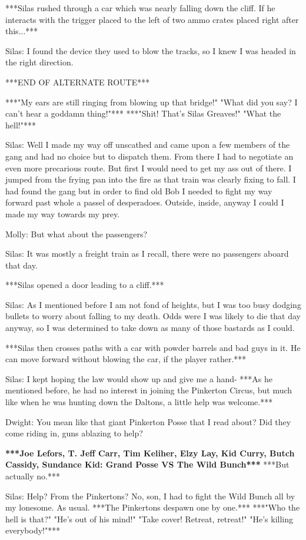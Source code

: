 \documentclass{article}
\begin{document}
***Silas rushed through a car which was nearly falling down the cliff. If he interacts with the trigger placed to the left of two ammo crates placed right after this...***

Silas: I found the device they used to blow the tracks, so I knew I was headed in the right direction.

***END OF ALTERNATE ROUTE***

***"My ears are still ringing from blowing up that bridge!" "What did you say? I can't hear a goddamn thing!"*** ***"Shit! That's Silas Greaves!" "What the hell!"***

Silas: Well I made my way off unscathed and came upon a few members of the gang and had no choice but to dispatch them. From there I had to negotiate an even more precarious route. But first I would need to get my ass out of there. I jumped from the frying pan into the fire as that train was clearly fixing to fall. I had found the gang but in order to find old Bob I needed to fight my way forward past whole a passel of desperadoes. Outside, inside, anyway I could I made my way towards my prey.

Molly: But what about the passengers?

Silas: It was mostly a freight train as I recall, there were no passengers aboard that day.

***Silas opened a door leading to a cliff.***

Silas: As I mentioned before I am not fond of heights, but I was too busy dodging bullets to worry about falling to my death. Odds were I was likely to die that day anyway, so I was determined to take down as many of those bastards as I could.

***Silas then crosses paths with a car with powder barrels and bad guys in it. He can move forward without blowing the car, if the player rather.***

Silas: I kept hoping the law would show up and give me a hand- ***As he mentioned before, he had no interest in joining the Pinkerton Circus, but much like when he was hunting down the Daltons, a little help was welcome.***

Dwight: You mean like that giant Pinkerton Posse that I read about? Did they come riding in, guns ablazing to help?

\textbf{***Joe Lefors, T. Jeff Carr, Tim Keliher, Elzy Lay, Kid Curry, Butch Cassidy, Sundance Kid: Grand Posse VS The Wild Bunch***} ***But actually no.***

Silas: Help? From the Pinkertons? No, son, I had to fight the Wild Bunch all by my lonesome. As usual. ***The Pinkertons despawn one by one.*** ***"Who the hell is that?" "He's out of his mind!" "Take cover! Retreat, retreat!" "He's killing everybody!"***
\end{document}
